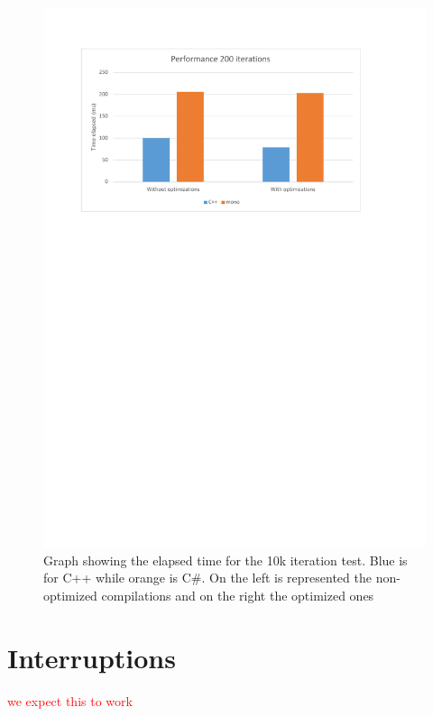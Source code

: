 \begin{figure}[H]\begin{center}
 \centering
  \captionsetup{justification=centering}
  \includegraphics[scale=0.9,page=2]{pictures/performance-tests/GPIO/graphs}
  \caption{Graph showing the elapsed time for the 10k iteration test. Blue is for C++ while orange is C\#. On the left is represented the non-optimized compilations and on the right the optimized ones\label{fig:gpio-graph-10k}}
\end{center}\end{figure}

\section{Interruptions}\label{SS:IOEx-Interruptions}
\textcolor{red}{we expect this to work}